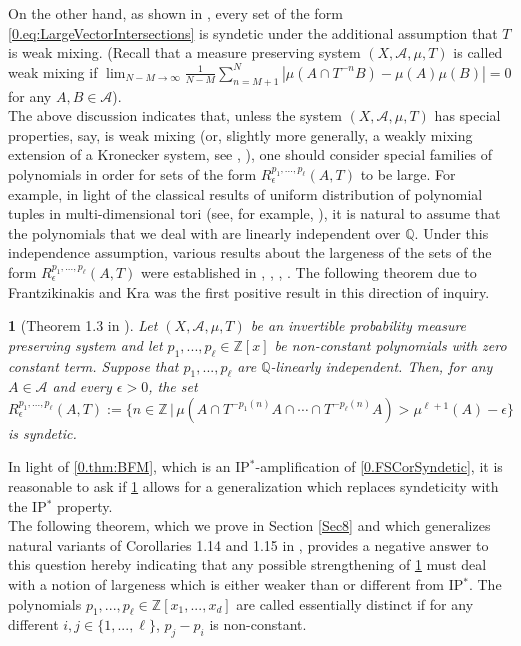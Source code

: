 \documentclass[11pt,american,preprint]{elsarticle}
\numberwithin{equation}{section}
\theoremstyle{plain}
\newtheorem{thm}{\protect\theoremname}[section]
\theoremstyle{plain*}
\theoremstyle{plain}
\theoremstyle{plain*}
\theoremstyle{plain}
\theoremstyle{plain*}
\theoremstyle{remark}
\theoremstyle{remark*}
\theoremstyle{remark}
\theoremstyle{remark*}
\theoremstyle{remark}
\theoremstyle{remark*}
\theoremstyle{plain}
\theoremstyle{definition}
\theoremstyle{plain}
\theoremstyle{plain} %
\providecommand{\theoremname}{Theorem}
\newcommand{\Q}{\mathbb{Q}}
\newcommand{\Z}{\mathbb{Z}}
\begin{document}
On the other hand, as shown in  \cite{WMPet}, every set of the form \eqref{0.eq:LargeVectorIntersections} is syndetic under the additional assumption that $T$ is weak mixing. 
(Recall that  a measure preserving system $(X,\mathcal A,\mu,T)$ is called  weak mixing if 
$\lim_{N-M\rightarrow\infty}\frac{1}{N-M}\sum_{n=M+1}^N|\mu(A\cap T^{-n}B)-\mu(A)\mu(B)|=0$
for any $A,B\in\mathcal A$). \\
The above discussion indicates that, unless the system $(X,\mathcal A,\mu,T)$ has special properties, say,  is weak mixing (or, slightly more generally, a weakly mixing extension of a Kronecker system, see \cite[Theorem 6.1]{HKAComplexityOfNilsystems},
 \cite[Theorem 4.3]{AlmostIPBerLeib}), one should consider special families of polynomials in order for  sets of the form $R_\epsilon^{p_1,...,p_\ell}(A,T)$ to be large.
 For example, in light of the classical results of uniform distribution of polynomial tuples in multi-dimensional tori \cite{weyl1916Mod1} (see, for example, \cite[Theorem 1.6.4]{kuipers2012uniform}), it is natural to assume that the polynomials that we deal with are linearly independent over $\Q$. Under this independence assumption, various results about the largeness of the sets of the form $R_\epsilon^{p_1,...,p_\ell}(A,T)$ were established  
in \cite{AlmostIPBerLeib}, \cite{fra2008ThreePolynomials},  \cite{FraKra2006IndependentPolys}, \cite{FraKuJoinErgForIndependentPolys}.
The following theorem due to Frantzikinakis and Kra was the first positive result in this direction of inquiry. 
\begin{thm}[Theorem 1.3 in \cite{FraKra2006IndependentPolys}]\label{0.thm:FraKraTheorem1.3} Let $(X,\mathcal A,\mu,T)$ be an invertible probability measure preserving system and let $p_1,...,p_\ell\in\Z[x]$ be non-constant polynomials with zero constant term. Suppose that $p_1,...,p_\ell$ are $\Q$-linearly independent. Then, for any $A\in\mathcal A$ and every $\epsilon>0$, the set 
\begin{equation}\label{0.eq:DefnR_eSingleT}
R_\epsilon^{p_1,...,p_\ell}(A,T):=\{ n\in\Z\,|\,\mu(A\cap T^{-p_1(n)}A\cap \cdots \cap T^{-p_\ell(n)}A)>\mu^{\ell+1}(A)-\epsilon \}
\end{equation}
is syndetic. 
\end{thm}
In light of \cref{0.thm:BFM}, which is an IP$^*$-amplification of \cref{0.FSCorSyndetic}, it is reasonable to ask if \cref{0.thm:FraKraTheorem1.3} allows for a generalization 
which replaces syndeticity with the IP$^*$ property. 
\\
 The following theorem, which we prove in Section \ref{Sec8} and which  generalizes natural variants of Corollaries 1.14 and 1.15 in \cite{zelada2025coexistence}, provides a negative answer to this question hereby indicating that  any possible strengthening of \cref{0.thm:FraKraTheorem1.3} must deal with a notion of largeness which is either weaker than or different  from IP$^*$. The polynomials $p_1,...,p_\ell\in \Z[x_1,...,x_d]$ are called essentially distinct if for any different $i,j\in\{1,...,\ell\}$, $p_j-p_i$ is non-constant. 
\end{document}
